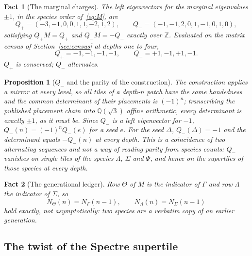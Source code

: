 \documentclass[11pt]{article}
\newtheorem{fact}{Fact}
\newtheorem{prop}{Proposition}
\theoremstyle{definition}
\theoremstyle{remark}
\begin{document}
\begin{fact}[The marginal charges]
\label{fact:charges}
The left eigenvectors for the marginal eigenvalues $\pm1$, in the species order
of~\eqref{eq:M}, are
\[
Q_{+}=(-3, -1, 0, 0, 1, 1, -2, 1, 2),\qquad Q_{-}=(-1, -1, 2, 0, 1, -1, 0, 1, 0),
\]
satisfying $Q_{+}M=Q_{+}$ and $Q_{-}M=-Q_{-}$ exactly over $\mathbb{Z}$.
Evaluated on the matrix census of Section~\ref{sec:census} at depths one to
four,
\[
Q_{+}=-1, -1, -1, -1,\qquad Q_{-}=+1, -1, +1, -1.
\]
$Q_{+}$ is conserved; $Q_{-}$ alternates.
\end{fact}

\begin{prop}[$Q_{-}$ and the parity of the construction]
\label{prop:parity}
The construction applies a mirror at every level, so all tiles of a depth-$n$ patch
have the same handedness and the common determinant of their placements is
$(-1)^{n}$; transcribing the published placement chain into $\mathbb{Q}(\sqrt3)$ affine
arithmetic, every determinant is exactly $\pm1$, as it must be.  Since $Q_{-}$ is a left
eigenvector for $-1$, $Q_{-}(n)=(-1)^{n}Q_{-}(e)$ for a seed $e$.  For the seed $\Delta$,
$Q_{-}(\Delta)=-1$ and the determinant equals $-Q_{-}(n)$ at every depth.  This is a
coincidence of two alternating sequences and not a way of reading parity from species
counts: $Q_{-}$ vanishes on single tiles of the species $\Lambda$, $\Sigma$ and $\Psi$, and
hence on the supertiles of those species at every depth.
\end{prop}

\begin{fact}[The generational ledger]
\label{fact:ledger}
Row $\Theta$ of $M$ is the indicator of $\Gamma$ and row $\Lambda$ the
indicator of $\Sigma$, so
\[
N_\Theta(n)=N_\Gamma(n-1),\qquad N_\Lambda(n)=N_\Sigma(n-1)
\]
hold exactly, not asymptotically: two species are a verbatim copy of an
earlier generation.
\end{fact}


\subsection{The twist of the Spectre supertile}
\label{sec:twist}
\end{document}
